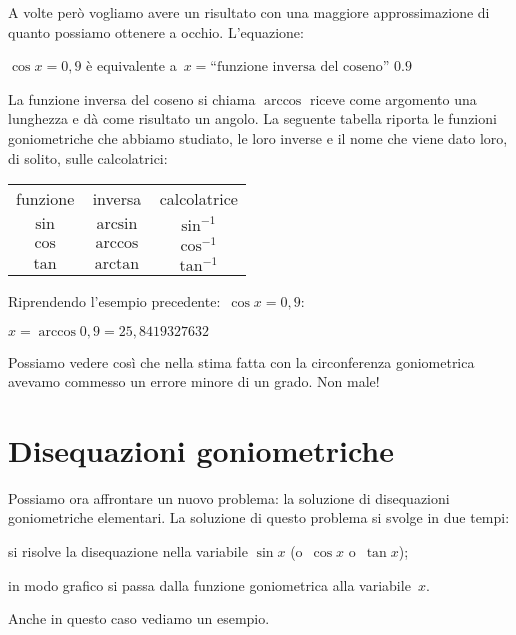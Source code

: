 A volte però vogliamo avere un risultato con una maggiore approssimazione di 
quanto possiamo ottenere a occhio. L'equazione:

\(\cos x = 0,9\) è equivalente 
a~\(x = \text{``funzione inversa del coseno'' } 0.9\)

La funzione inversa del coseno si chiama \(\arccos\) riceve come argomento una
lunghezza e dà come risultato un angolo. La seguente tabella riporta le 
funzioni goniometriche che abbiamo studiato, le loro inverse e il nome che 
viene dato loro, di solito, sulle calcolatrici:

\begin{center}
\begin{tabular}{ccc}
funzione & inversa & calcolatrice\\
\(\sin\) & \(\arcsin\) & \(\sin^{-1}\)\\
\(\cos\) & \(\arccos\) & \(\cos^{-1}\)\\
\(\tan\) & \(\arctan\) & \(\tan^{-1}\)
\end{tabular}
\end{center}

\begin{esempio}
 Riprendendo l'esempio precedente:~\(\cos x = 0,9\):
 
 \(x = \arccos 0,9 = 25,8419327632\) 
 
 Possiamo vedere così che nella stima fatta con la circonferenza goniometrica 
 avevamo commesso un errore minore di un grado. Non male!
\end{esempio}


\section{Disequazioni goniometriche}
\label{sec:gonio_disequazionigonio}

Possiamo ora affrontare un nuovo problema: la soluzione di disequazioni 
goniometriche elementari. La soluzione di questo problema si svolge in due 
tempi:
\begin{enumerate*}
 \item si risolve la disequazione nella variabile \(\sin x\) 
  (o~\(\cos x\) o~\(\tan x\));
 \item in modo grafico si passa dalla funzione goniometrica alla 
variabile~\(x\).
\end{enumerate*}

Anche in questo caso vediamo un esempio.

